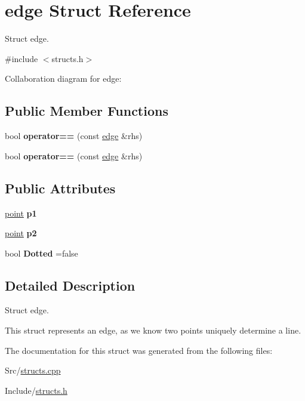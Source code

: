 \hypertarget{structedge}{}\section{edge Struct Reference}
\label{structedge}


Struct edge.  




{\ttfamily \#include $<$structs.\+h$>$}



Collaboration diagram for edge\+:
\subsection*{Public Member Functions}
\begin{DoxyCompactItemize}
\item 
bool {\bfseries operator==} (const \hyperlink{structedge}{edge} \&rhs)\hypertarget{structedge_a7efc495182c57028f56d1b37394907e2}{}\label{structedge_a7efc495182c57028f56d1b37394907e2}

\item 
bool {\bfseries operator==} (const \hyperlink{structedge}{edge} \&rhs)\hypertarget{structedge_a7efc495182c57028f56d1b37394907e2}{}\label{structedge_a7efc495182c57028f56d1b37394907e2}

\end{DoxyCompactItemize}
\subsection*{Public Attributes}
\begin{DoxyCompactItemize}
\item 
\hyperlink{structpoint}{point} {\bfseries p1}\hypertarget{structedge_a7b074374ee3059d29a93e9e76480274e}{}\label{structedge_a7b074374ee3059d29a93e9e76480274e}

\item 
\hyperlink{structpoint}{point} {\bfseries p2}\hypertarget{structedge_a105ba74e7b01aba7e0e113ab286dc883}{}\label{structedge_a105ba74e7b01aba7e0e113ab286dc883}

\item 
bool {\bfseries Dotted} =false\hypertarget{structedge_ae35774472063d8f38a1ce7b375b39921}{}\label{structedge_ae35774472063d8f38a1ce7b375b39921}

\end{DoxyCompactItemize}


\subsection{Detailed Description}
Struct edge. 

This struct represents an edge, as we know two points uniquely determine a line. 

The documentation for this struct was generated from the following files\+:\begin{DoxyCompactItemize}
\item 
Src/\hyperlink{structs_8cpp}{structs.\+cpp}\item 
Include/\hyperlink{structs_8h}{structs.\+h}\end{DoxyCompactItemize}
